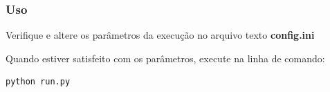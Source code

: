 \documentclass[paper=a4, fontsize=11pt]{scrartcl}
\numberwithin{equation}{section}		%
\numberwithin{figure}{section}			%
\numberwithin{table}{section}				%
\begin{document}
\subsubsection{Uso}
Verifique e altere os parâmetros da execução no arquivo texto \textbf{config.ini}

Quando estiver satisfeito com os parâmetros, execute na linha de comando:
\begin{lstlisting}[language=bash, frame=leftline,basicstyle=\footnotesize\ttfamily] 
python run.py
\end{lstlisting}



\end{document}
